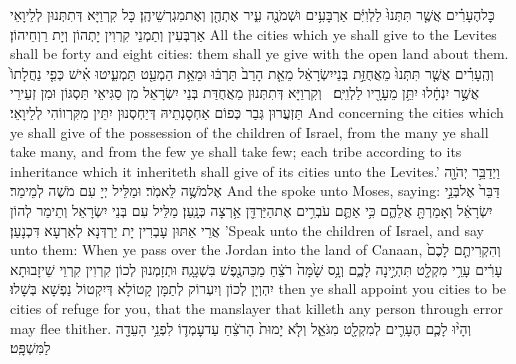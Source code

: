 {כׇּל\maqqaf הֶעָרִ֗ים אֲשֶׁ֤ר תִּתְּנוּ֙ לַלְוִיִּ֔ם אַרְבָּעִ֥ים וּשְׁמֹנֶ֖ה עִ֑יר אֶתְהֶ֖ן וְאֶת\maqqaf מִגְרְשֵׁיהֶֽן׃}
{כָּל קִרְוַיָּא דְּתִתְּנוּן לְלֵיוָאֵי אַרְבְּעִין וְתַמְנֵי קִרְוִין יָתְהוֹן וְיָת רַוְחֵיהוֹן׃}
{All the cities which ye shall give to the Levites shall be forty and eight cities: them shall ye give with the open land about them.}{}
{וְהֶֽעָרִ֗ים אֲשֶׁ֤ר תִּתְּנוּ֙ מֵאֲחֻזַּ֣ת בְּנֵי\maqqaf יִשְׂרָאֵ֔ל מֵאֵ֤ת הָרַב֙ תַּרְבּ֔וּ וּמֵאֵ֥ת הַמְעַ֖ט תַּמְעִ֑יטוּ אִ֗ישׁ כְּפִ֤י נַחֲלָתוֹ֙ אֲשֶׁ֣ר יִנְחָ֔לוּ יִתֵּ֥ן מֵעָרָ֖יו לַלְוִיִּֽם׃ \petucha }
{וְקִרְוַיָּא דְּתִתְּנוּן מֵאֲחֻדַּת בְּנֵי יִשְׂרָאֵל מִן סַגִּיאֵי תַּסְגּוֹן וּמִן זְעֵירֵי תַּזְעֲרוּן גְּבַר כְּפוֹם אַחְסָנְתֵיהּ דְּיַחְסְנוּן יִתֵּין מִקִּרְווֹהִי לְלֵיוָאֵי׃}
{And concerning the cities which ye shall give of the possession of the children of Israel, from the many ye shall take many, and from the few ye shall take few; each tribe according to its inheritance which it inheriteth shall give of its cities unto the Levites.’}{}
{וַיְדַבֵּ֥ר יְהֹוָ֖ה אֶל\maqqaf מֹשֶׁ֥ה לֵּאמֹֽר׃}
{וּמַלֵּיל יְיָ עִם מֹשֶׁה לְמֵימַר׃}
{And the \lord\space spoke unto Moses, saying:}{}
{דַּבֵּר֙ אֶל\maqqaf בְּנֵ֣י יִשְׂרָאֵ֔ל וְאָמַרְתָּ֖ אֲלֵהֶ֑ם כִּ֥י אַתֶּ֛ם עֹבְרִ֥ים אֶת\maqqaf הַיַּרְדֵּ֖ן אַ֥רְצָה כְּנָֽעַן׃}
{מַלֵּיל עִם בְּנֵי יִשְׂרָאֵל וְתֵימַר לְהוֹן אֲרֵי אַתּוּן עָבְרִין יָת יַרְדְּנָא לְאַרְעָא דִּכְנָעַן׃}
{’Speak unto the children of Israel, and say unto them: When ye pass over the Jordan into the land of Canaan,}{}
{וְהִקְרִיתֶ֤ם לָכֶם֙ עָרִ֔ים עָרֵ֥י מִקְלָ֖ט תִּהְיֶ֣ינָה לָכֶ֑ם וְנָ֥ס שָׁ֙מָּה֙ רֹצֵ֔חַ מַכֵּה\maqqaf נֶ֖פֶשׁ בִּשְׁגָגָֽה׃}
{וּתְזָמְנוּן לְכוֹן קִרְוִין קִרְוֵי שֵׁיזָבוּתָא יִהְוְיָן לְכוֹן וְיִעְרוֹק לְתַמָּן קָטוֹלָא דְּיִקְטוֹל נַפְשָׁא בְּשָׁלוּ׃}
{then ye shall appoint you cities to be cities of refuge for you, that the manslayer that killeth any person through error may flee thither.}{}
{וְהָי֨וּ לָכֶ֧ם הֶעָרִ֛ים לְמִקְלָ֖ט מִגֹּאֵ֑ל וְלֹ֤א יָמוּת֙ הָרֹצֵ֔חַ עַד\maqqaf עׇמְד֛וֹ לִפְנֵ֥י הָעֵדָ֖ה לַמִּשְׁפָּֽט׃}
